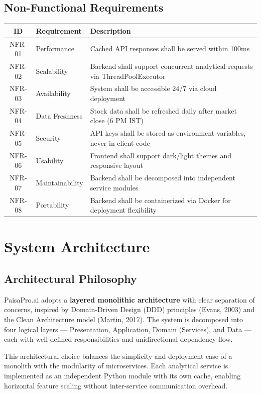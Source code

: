 \documentclass[12pt, a4paper, oneside]{report}
\newcommand{\projectname}{PaisaPro.ai}
\begin{document}
\subsection{Non-Functional Requirements}

\begin{longtable}{@{}c p{4cm} p{8cm}@{}}
\toprule
\textbf{ID} & \textbf{Requirement} & \textbf{Description} \\
\midrule
\endhead
NFR-01 & Performance & Cached API responses shall be served within 100ms \\
NFR-02 & Scalability & Backend shall support concurrent analytical requests via ThreadPoolExecutor \\
NFR-03 & Availability & System shall be accessible 24/7 via cloud deployment \\
NFR-04 & Data Freshness & Stock data shall be refreshed daily after market close (6 PM IST) \\
NFR-05 & Security & API keys shall be stored as environment variables, never in client code \\
NFR-06 & Usability & Frontend shall support dark/light themes and responsive layout \\
NFR-07 & Maintainability & Backend shall be decomposed into independent service modules \\
NFR-08 & Portability & Backend shall be containerized via Docker for deployment flexibility \\
\bottomrule
\end{longtable}

\section{System Architecture}
\label{sec:architecture}

\subsection{Architectural Philosophy}

\projectname{} adopts a \textbf{layered monolithic architecture} with clear separation of concerns, inspired by Domain-Driven Design (DDD) principles (Evans, 2003) and the Clean Architecture model (Martin, 2017). The system is decomposed into four logical layers --- Presentation, Application, Domain (Services), and Data --- each with well-defined responsibilities and unidirectional dependency flow.

This architectural choice balances the simplicity and deployment ease of a monolith with the modularity of microservices. Each analytical service is implemented as an independent Python module with its own cache, enabling horizontal feature scaling without inter-service communication overhead.
\end{document}
